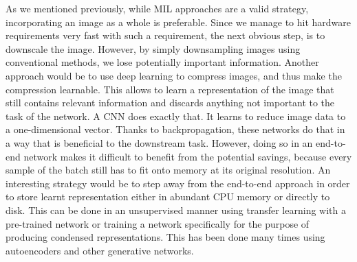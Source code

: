 As we mentioned previously, while MIL approaches are a valid strategy, incorporating an image as a whole is preferable. Since we manage to hit hardware requirements very fast with such a requirement, the next obvious step, is to downscale the image. However, by simply downsampling images using conventional methods, we lose potentially important information. Another approach would be to use deep learning to compress images, and thus make the compression learnable. 
This allows to learn a representation of the image that still contains relevant information and discards anything not important to the task of the network. A CNN does exactly that. It learns to reduce image data to a one-dimensional vector. Thanks to backpropagation, these networks do that in a way that is beneficial to the downstream task.
However, doing so in an end-to-end network makes it difficult to benefit from the potential savings, because every sample of the batch still has to fit onto memory at its original resolution. 
An interesting strategy would be to step away from the end-to-end approach in order to store learnt representation either in abundant CPU memory or directly to disk. This can be done in an unsupervised manner using transfer learning with a pre-trained network \cite{Chen2021Multimodal} or training a network specifically for the purpose of producing condensed representations. This has been done many times using autoencoders and other generative networks. \cite{Celik2021Extracting, Tellez2019Neural, Quan2022Global, Hecht2020Disentangled, Celik2021Extracting, Sun2022Deep, Roy2021Convolutional}

